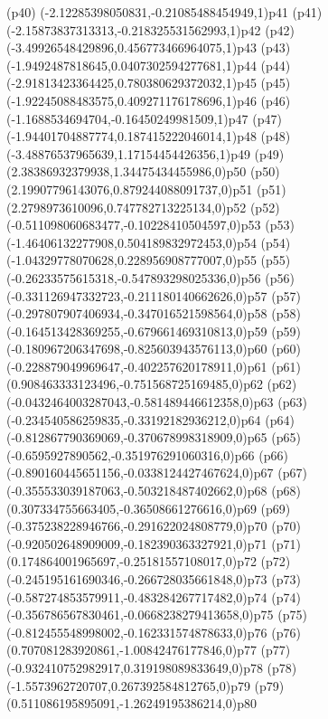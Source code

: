 \psdot(p40)
\psPoint(-2.12285398050831,-0.21085488454949,1){p41}
\psdot(p41)
\psPoint(-2.15873837313313,-0.218325531562993,1){p42}
\psdot(p42)
\psPoint(-3.49926548429896,0.456773466964075,1){p43}
\psdot(p43)
\psPoint(-1.9492487818645,0.0407302594277681,1){p44}
\psdot(p44)
\psPoint(-2.91813423364425,0.780380629372032,1){p45}
\psdot(p45)
\psPoint(-1.92245088483575,0.409271176178696,1){p46}
\psdot(p46)
\psPoint(-1.1688534694704,-0.16450249981509,1){p47}
\psdot(p47)
\psPoint(-1.94401704887774,0.187415222046014,1){p48}
\psdot(p48)
\psPoint(-3.48876537965639,1.17154454426356,1){p49}
\psdot(p49)
\psPoint(2.38386932379938,1.34475434455986,0){p50}
\psdot(p50)
\psPoint(2.19907796143076,0.879244088091737,0){p51}
\psdot(p51)
\psPoint(2.2798973610096,0.747782713225134,0){p52}
\psdot(p52)
\psPoint(-0.511098060683477,-0.10228410504597,0){p53}
\psdot(p53)
\psPoint(-1.46406132277908,0.504189832972453,0){p54}
\psdot(p54)
\psPoint(-1.04329778070628,0.228956908777007,0){p55}
\psdot(p55)
\psPoint(-0.26233575615318,-0.547893298025336,0){p56}
\psdot(p56)
\psPoint(-0.331126947332723,-0.211180140662626,0){p57}
\psdot(p57)
\psPoint(-0.297807907406934,-0.347016521598564,0){p58}
\psdot(p58)
\psPoint(-0.164513428369255,-0.679661469310813,0){p59}
\psdot(p59)
\psPoint(-0.180967206347698,-0.825603943576113,0){p60}
\psdot(p60)
\psPoint(-0.228879049969647,-0.402257620178911,0){p61}
\psdot(p61)
\psPoint(0.908463333123496,-0.751568725169485,0){p62}
\psdot(p62)
\psPoint(-0.0432464003287043,-0.581489446612358,0){p63}
\psdot(p63)
\psPoint(-0.234540586259835,-0.33192182936212,0){p64}
\psdot(p64)
\psPoint(-0.812867790369069,-0.370678998318909,0){p65}
\psdot(p65)
\psPoint(-0.6595927890562,-0.351976291060316,0){p66}
\psdot(p66)
\psPoint(-0.890160445651156,-0.0338124427467624,0){p67}
\psdot(p67)
\psPoint(-0.355533039187063,-0.503218487402662,0){p68}
\psdot(p68)
\psPoint(0.307334755663405,-0.36508661276616,0){p69}
\psdot(p69)
\psPoint(-0.375238228946766,-0.291622024808779,0){p70}
\psdot(p70)
\psPoint(-0.920502648909009,-0.182390363327921,0){p71}
\psdot(p71)
\psPoint(0.174864001965697,-0.25181557108017,0){p72}
\psdot(p72)
\psPoint(-0.245195161690346,-0.266728035661848,0){p73}
\psdot(p73)
\psPoint(-0.587274853579911,-0.483284267717482,0){p74}
\psdot(p74)
\psPoint(-0.356786567830461,-0.0668238279413658,0){p75}
\psdot(p75)
\psPoint(-0.812455548998002,-0.162331574878633,0){p76}
\psdot(p76)
\psPoint(0.707081283920861,-1.00842476177846,0){p77}
\psdot(p77)
\psPoint(-0.932410752982917,0.319198089833649,0){p78}
\psdot(p78)
\psPoint(-1.5573962720707,0.267392584812765,0){p79}
\psdot(p79)
\psPoint(0.511086195895091,-1.26249195386214,0){p80}
